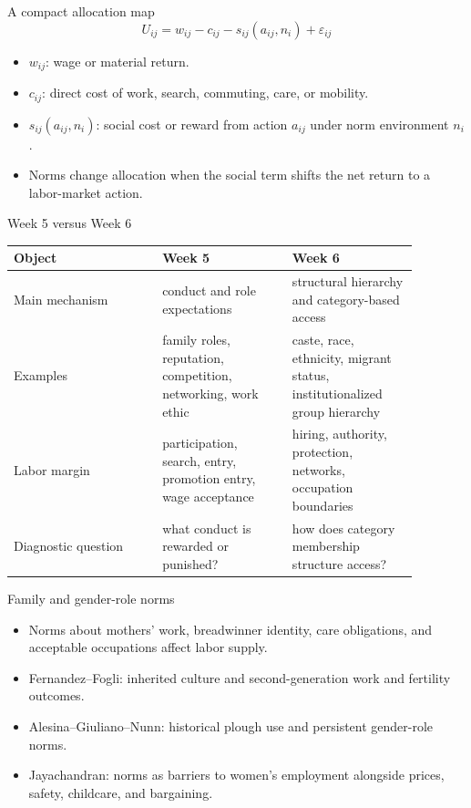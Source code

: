 \documentclass[aspectratio=169,11pt]{beamer}
\begin{document}
\begin{frame}{A compact allocation map}
\[
U_{ij} = w_{ij} - c_{ij} - s_{ij}(a_{ij}, n_i) + \varepsilon_{ij}
\]
\begin{itemize}
    \item $w_{ij}$: wage or material return.
    \item $c_{ij}$: direct cost of work, search, commuting, care, or mobility.
    \item $s_{ij}(a_{ij}, n_i)$: social cost or reward from action $a_{ij}$ under norm environment $n_i$.
    \item Norms change allocation when the social term shifts the net return to a labor-market action.
\end{itemize}
\end{frame}

\begin{frame}{Week 5 versus Week 6}
\small
\begin{tabular}{p{0.32\linewidth} p{0.29\linewidth} p{0.27\linewidth}}
\toprule
Object & Week 5 & Week 6 \\
\midrule
Main mechanism & conduct and role expectations & structural hierarchy and category-based access \\
Examples & family roles, reputation, competition, networking, work ethic & caste, race, ethnicity, migrant status, institutionalized group hierarchy \\
Labor margin & participation, search, entry, promotion entry, wage acceptance & hiring, authority, protection, networks, occupation boundaries \\
Diagnostic question & what conduct is rewarded or punished? & how does category membership structure access? \\
\bottomrule
\end{tabular}
\end{frame}

\begin{frame}{Family and gender-role norms}
\begin{itemize}
    \item Norms about mothers' work, breadwinner identity, care obligations, and acceptable occupations affect labor supply.
    \item Fernandez--Fogli: inherited culture and second-generation work and fertility outcomes.
    \item Alesina--Giuliano--Nunn: historical plough use and persistent gender-role norms.
    \item Jayachandran: norms as barriers to women's employment alongside prices, safety, childcare, and bargaining.
\end{itemize}
\end{frame}
\end{document}
